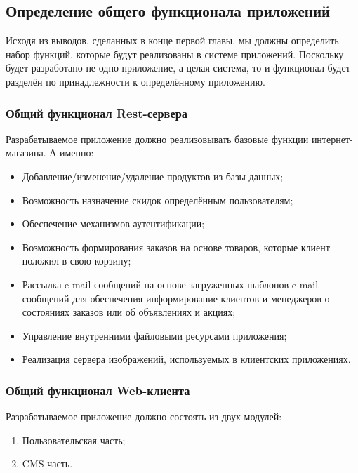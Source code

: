 \subsection{Определение общего функционала приложений}\label{subsec:2-define-functionality}\indent

Исходя из выводов, сделанных в конце первой главы, мы должны определить набор функций, которые будут реализованы в системе приложений.
Поскольку будет разработано не одно приложение, а целая система, то и функционал будет разделён по принадлежности к определённому приложению.

\subsubsection{Общий функционал Rest-сервера}\indent

Разрабатываемое приложение должно реализовывать базовые функции интернет-магазина.
А именно:

\begin{itemize}
    \item Добавление/изменение/удаление продуктов из базы данных;
    \item Возможность назначение скидок определённым пользователям;
    \item Обеспечение механизмов аутентификации;
    \item Возможность формирования заказов на основе товаров, которые клиент положил в свою корзину;
    \item Рассылка e-mail сообщений на основе загруженных шаблонов e-mail сообщений для обеспечения информирование клиентов и менеджеров о состояниях заказов или об объявлениях и акциях;
    \item Управление внутренними файловыми ресурсами приложения;
    \item Реализация сервера изображений, используемых в клиентских приложениях.
\end{itemize}

\subsubsection{Общий функционал Web-клиента}\indent

Разрабатываемое приложение должно состоять из двух модулей:

\begin{enumerate}
    \item Пользовательская часть;
    \item CMS-часть.
\end{enumerate}

